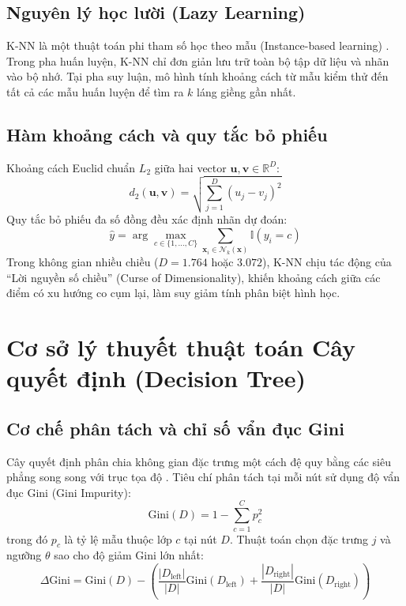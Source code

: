 \documentclass[../DoAn.tex]{subfiles}
\begin{document}
\subsection{Nguyên lý học lười (Lazy Learning)}
K-NN là một thuật toán phi tham số học theo mẫu (Instance-based learning) \cite{bishop2006pattern}. Trong pha huấn luyện, K-NN chỉ đơn giản lưu trữ toàn bộ tập dữ liệu và nhãn vào bộ nhớ. Tại pha suy luận, mô hình tính khoảng cách từ mẫu kiểm thử đến tất cả các mẫu huấn luyện để tìm ra $k$ láng giềng gần nhất.

\subsection{Hàm khoảng cách và quy tắc bỏ phiếu}
Khoảng cách Euclid chuẩn $L_2$ giữa hai vector $\mathbf{u}, \mathbf{v} \in \mathbb{R}^D$:
\begin{equation}
    d_2(\mathbf{u}, \mathbf{v}) = \sqrt{\sum_{j=1}^D (u_j - v_j)^2}
\end{equation}
Quy tắc bỏ phiếu đa số đồng đều xác định nhãn dự đoán:
\begin{equation}
    \hat{y} = \arg\max_{c \in \{1, \dots, C\}} \sum_{\mathbf{x}_i \in \mathcal{N}_k(\mathbf{x})} \mathbb{I}(y_i = c)
\end{equation}
Trong không gian nhiều chiều ($D = 1.764$ hoặc $3.072$), K-NN chịu tác động của ``Lời nguyền số chiều'' (Curse of Dimensionality), khiến khoảng cách giữa các điểm có xu hướng co cụm lại, làm suy giảm tính phân biệt hình học.

\section{Cơ sở lý thuyết thuật toán Cây quyết định (Decision Tree)}
\subsection{Cơ chế phân tách và chỉ số vẩn đục Gini}
Cây quyết định phân chia không gian đặc trưng một cách đệ quy bằng các siêu phẳng song song với trục tọa độ \cite{hastie2009elements}. Tiêu chí phân tách tại mỗi nút sử dụng độ vẩn đục Gini (Gini Impurity):
\begin{equation}
    \text{Gini}(D) = 1 - \sum_{c=1}^C p_c^2
\end{equation}
trong đó $p_c$ là tỷ lệ mẫu thuộc lớp $c$ tại nút $D$. Thuật toán chọn đặc trưng $j$ và ngưỡng $\theta$ sao cho độ giảm Gini lớn nhất:
\begin{equation}
    \Delta \text{Gini} = \text{Gini}(D) - \left( \frac{|D_{\text{left}}|}{|D|} \text{Gini}(D_{\text{left}}) + \frac{|D_{\text{right}}|}{|D|} \text{Gini}(D_{\text{right}}) \right)
\end{equation}
\end{document}
